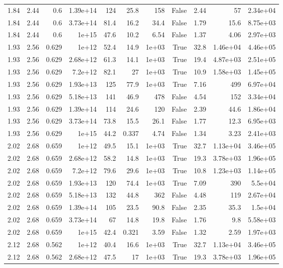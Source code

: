 \begin{table}
\begin{tabular}{rrrrrrrrrrr}
1.84 & 2.44 & 0.6 & 1.39e+14 & 124 & 25.8 & 158 & False & 2.44 & 57 & 2.34e+04 \\
1.84 & 2.44 & 0.6 & 3.73e+14 & 81.4 & 16.2 & 34.4 & False & 1.79 & 15.6 & 8.75e+03 \\
1.84 & 2.44 & 0.6 & 1e+15 & 47.6 & 10.2 & 6.54 & False & 1.37 & 4.06 & 2.97e+03 \\
1.93 & 2.56 & 0.629 & 1e+12 & 52.4 & 14.9 & 1e+03 & True & 32.8 & 1.46e+04 & 4.46e+05 \\
1.93 & 2.56 & 0.629 & 2.68e+12 & 61.3 & 14.1 & 1e+03 & True & 19.4 & 4.87e+03 & 2.51e+05 \\
1.93 & 2.56 & 0.629 & 7.2e+12 & 82.1 & 27 & 1e+03 & True & 10.9 & 1.58e+03 & 1.45e+05 \\
1.93 & 2.56 & 0.629 & 1.93e+13 & 125 & 77.9 & 1e+03 & True & 7.16 & 499 & 6.97e+04 \\
1.93 & 2.56 & 0.629 & 5.18e+13 & 141 & 46.9 & 478 & False & 4.54 & 152 & 3.34e+04 \\
1.93 & 2.56 & 0.629 & 1.39e+14 & 114 & 24.6 & 120 & False & 2.39 & 44.6 & 1.86e+04 \\
1.93 & 2.56 & 0.629 & 3.73e+14 & 73.8 & 15.5 & 26.1 & False & 1.77 & 12.3 & 6.95e+03 \\
1.93 & 2.56 & 0.629 & 1e+15 & 44.2 & 0.337 & 4.74 & False & 1.34 & 3.23 & 2.41e+03 \\
2.02 & 2.68 & 0.659 & 1e+12 & 49.5 & 15.1 & 1e+03 & True & 32.7 & 1.13e+04 & 3.46e+05 \\
2.02 & 2.68 & 0.659 & 2.68e+12 & 58.2 & 14.8 & 1e+03 & True & 19.3 & 3.78e+03 & 1.96e+05 \\
2.02 & 2.68 & 0.659 & 7.2e+12 & 79.6 & 29.6 & 1e+03 & True & 10.8 & 1.23e+03 & 1.14e+05 \\
2.02 & 2.68 & 0.659 & 1.93e+13 & 120 & 74.4 & 1e+03 & True & 7.09 & 390 & 5.5e+04 \\
2.02 & 2.68 & 0.659 & 5.18e+13 & 132 & 44.8 & 362 & False & 4.48 & 119 & 2.67e+04 \\
2.02 & 2.68 & 0.659 & 1.39e+14 & 105 & 23.5 & 90.8 & False & 2.35 & 35.3 & 1.5e+04 \\
2.02 & 2.68 & 0.659 & 3.73e+14 & 67 & 14.8 & 19.8 & False & 1.76 & 9.8 & 5.58e+03 \\
2.02 & 2.68 & 0.659 & 1e+15 & 42.4 & 0.321 & 3.59 & False & 1.32 & 2.59 & 1.97e+03 \\
2.12 & 2.68 & 0.562 & 1e+12 & 40.4 & 16.6 & 1e+03 & True & 32.7 & 1.13e+04 & 3.46e+05 \\
2.12 & 2.68 & 0.562 & 2.68e+12 & 47.5 & 17 & 1e+03 & True & 19.3 & 3.78e+03 & 1.96e+05 \\

\end{tabular}
\end{table}

